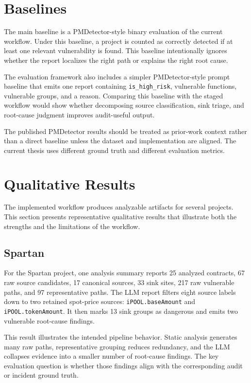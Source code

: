 \section{Baselines}

The main baseline is a PMDetector-style binary evaluation of the current
workflow. Under this baseline, a project is counted as correctly detected if at
least one relevant vulnerability is found. This baseline intentionally ignores
whether the report localizes the right path or explains the right root cause.

The evaluation framework also includes a simpler PMDetector-style prompt
baseline that emits one report containing
\texttt{is\_high\_risk}, vulnerable functions, vulnerable groups, and a reason.
Comparing this baseline with the staged workflow would show whether decomposing
source classification, sink triage, and root-cause judgment improves
audit-useful output.

The published PMDetector results should be treated as prior-work context rather
than a direct baseline unless the dataset and implementation are aligned. The
current thesis uses different ground truth and different evaluation metrics.

\section{Qualitative Results}

The implemented workflow produces analyzable artifacts for several projects.
This section presents representative qualitative results that illustrate both
the strengths and the limitations of the workflow.

\subsection{Spartan}

For the Spartan project, one analysis summary reports 25 analyzed contracts, 67
raw source candidates, 17 canonical sources, 33 sink sites, 217 raw vulnerable
paths, and 97 representative paths. The LLM report filters eight source labels
down to two retained spot-price sources: \texttt{iPOOL.baseAmount} and
\texttt{iPOOL.tokenAmount}. It then marks 13 sink groups as dangerous and emits
two vulnerable root-cause findings.

This result illustrates the intended pipeline behavior. Static analysis
generates many raw paths, representative grouping reduces redundancy, and the
LLM collapses evidence into a smaller number of root-cause findings. The
key evaluation question is whether those findings align with the corresponding
audit or incident ground truth.

